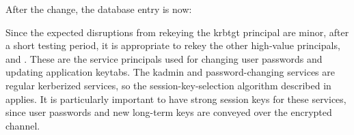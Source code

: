 \documentclass[letterpaper,10pt,english]{sphinxmanual}
\begin{document}
After the change, the database entry is now:

%
\begin{sphinxVerbatim}[commandchars=\\\{\}]
\PYG{p}{[} \PYG{p}{]}
\PYG{p}{[}\PYG{p}{]}
   
   
   
   
   
   
\PYG{p}{[}\PYG{p}{]}
\end{sphinxVerbatim}

Since the expected disruptions from rekeying the krbtgt principal are
minor, after a short testing period, it is
appropriate to rekey the other high-value principals, 
and . These are the service principals used for
changing user passwords and updating application keytabs.  The kadmin
and password-changing services are regular kerberized services, so the
session-key-selection algorithm described in {\hyperref[\detokenize{admin/enctypes:session-key-selection}]{}}
applies.  It is particularly important to have strong session keys for
these services, since user passwords and new long-term keys are conveyed
over the encrypted channel.
\end{document}
